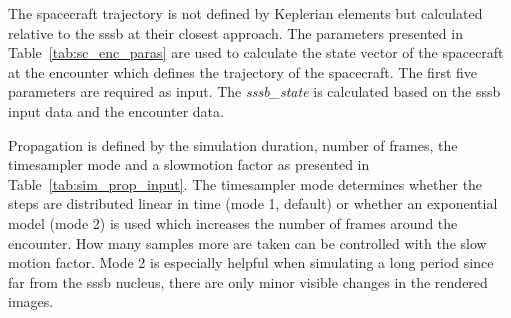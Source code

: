 The spacecraft trajectory is not defined by Keplerian elements but calculated relative to the \gls{sssb} at their closest approach. The parameters presented in Table~\ref{tab:sc_enc_paras} are used to calculate the state vector of the spacecraft at the encounter which defines the trajectory of the spacecraft. The first five parameters are required as input. The \textit{sssb\_state} is calculated based on the \gls{sssb} input data and the encounter data.

\begin{table}[htb]
    \centering
    \caption{Parameters that define the encounter state of the spacecraft. The first five parameters are required as input.}
    \label{tab:sc_enc_paras}
\end{table}

Propagation is defined by the simulation duration, number of frames, the timesampler mode and a slowmotion factor as presented in Table~\ref{tab:sim_prop_input}. The timesampler mode determines whether the steps are distributed linear in time (mode 1, default) or whether an exponential model (mode 2) is used which increases the number of frames around the encounter. How many samples more are taken can be controlled with the slow motion factor. Mode 2 is especially helpful when simulating a long period since far from the \gls{sssb} nucleus, there are only minor visible changes in the rendered images.

